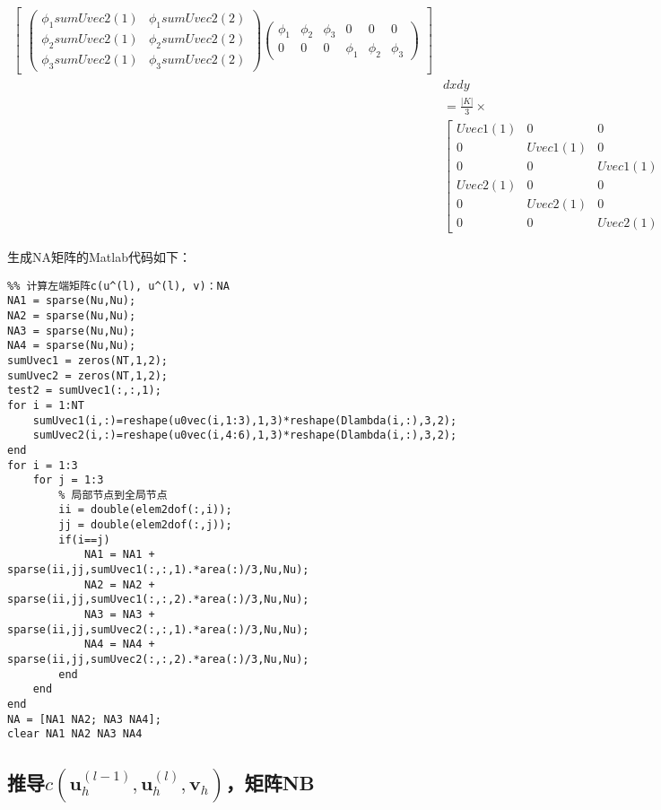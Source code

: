 \documentclass{ctexart}
\begin{document}
\begin{align*}
\begin{bmatrix}
    \begin{pmatrix}
      \phi_1 sumUvec2(1)&  \phi_1 sumUvec2(2)\\
      \phi_2 sumUvec2(1)&  \phi_2 sumUvec2(2) \\
      \phi_3 sumUvec2(1)&  \phi_3 sumUvec2(2)
    \end{pmatrix}
    \begin{pmatrix}
      \phi_1& \phi_2 & \phi_3 & 0 & 0 & 0\\
      0&  0& 0 & \phi_1 & \phi_2 & \phi_3
    \end{pmatrix}   
    \end{bmatrix} \\
    & dxdy \\
    & = \frac{|K|}{3} \times \\
    & \begin{bmatrix}
      Uvec1(1)& 0 & 0 & Uvec1(2) & 0 & 0 \\
      0 & Uvec1(1) & 0 &  0 & Uvec1(2) & 0\\
      0 & 0 & Uvec1(1) &  0 & 0 &  Uvec1(2)\\
     Uvec2(1)& 0 & 0 & Uvec2(2) & 0 & 0 \\
      0 & Uvec2(1) & 0 &  0 & Uvec2(2) & 0\\
      0 & 0 & Uvec2(1) &  0 & 0 &  Uvec2(2)
    \end{bmatrix}
\end{align*}

生成NA矩阵的Matlab代码如下：
\begin{lstlisting}
%% 计算左端矩阵c(u^(l), u^(l), v)：NA
NA1 = sparse(Nu,Nu);
NA2 = sparse(Nu,Nu);
NA3 = sparse(Nu,Nu);
NA4 = sparse(Nu,Nu);
sumUvec1 = zeros(NT,1,2);
sumUvec2 = zeros(NT,1,2);
test2 = sumUvec1(:,:,1);
for i = 1:NT
    sumUvec1(i,:)=reshape(u0vec(i,1:3),1,3)*reshape(Dlambda(i,:),3,2);
    sumUvec2(i,:)=reshape(u0vec(i,4:6),1,3)*reshape(Dlambda(i,:),3,2);
end
for i = 1:3
    for j = 1:3
        % 局部节点到全局节点
        ii = double(elem2dof(:,i));
        jj = double(elem2dof(:,j));
        if(i==j)
            NA1 = NA1 + sparse(ii,jj,sumUvec1(:,:,1).*area(:)/3,Nu,Nu); 
            NA2 = NA2 + sparse(ii,jj,sumUvec1(:,:,2).*area(:)/3,Nu,Nu); 
            NA3 = NA3 + sparse(ii,jj,sumUvec2(:,:,1).*area(:)/3,Nu,Nu); 
            NA4 = NA4 + sparse(ii,jj,sumUvec2(:,:,2).*area(:)/3,Nu,Nu); 
        end 
    end
end
NA = [NA1 NA2; NA3 NA4];
clear NA1 NA2 NA3 NA4
\end{lstlisting}


\subsection{推导$c(\mathbf{u}_h^{(l-1)}, \mathbf{u}_h^{(l)}, \mathbf{v}_h)$，矩阵NB}
\end{document}

